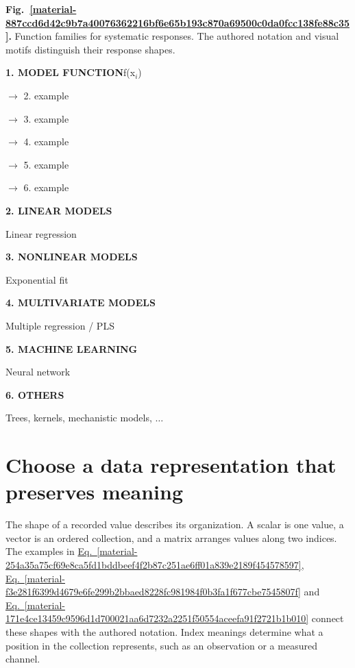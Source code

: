 \documentclass[11pt,a4paper]{article}
\begin{document}
\par\medskip
\Needspace{10cm}
\label{material-887ccd6d42c9b7a40076362216bf6e65b193c870a69500c0da0fcc138fe88c35}
\noindent\textbf{Fig.~\ref*{material-887ccd6d42c9b7a40076362216bf6e65b193c870a69500c0da0fcc138fe88c35}.} Function families for systematic responses. The authored notation and visual motifs distinguish their response shapes.\par\nopagebreak
\par\medskip\noindent\textcolor{pcd1}{\textbf{1. MODEL FUNCTION}}\quad f(x\ensuremath{{}_i})\par


\par\noindent $\longrightarrow$ 2. example
\par\noindent $\longrightarrow$ 3. example
\par\noindent $\longrightarrow$ 4. example
\par\noindent $\longrightarrow$ 5. example
\par\noindent $\longrightarrow$ 6. example
\par\medskip\noindent\textcolor{pcd2}{\textbf{2. LINEAR MODELS}}\par
Linear regression


\par\medskip\noindent\textcolor{pcd3}{\textbf{3. NONLINEAR MODELS}}\par
Exponential fit


\par\medskip\noindent\textcolor{pcd4}{\textbf{4. MULTIVARIATE MODELS}}\par
Multiple regression / PLS


\par\medskip\noindent\textcolor{pcd5}{\textbf{5. MACHINE LEARNING}}\par
Neural network


\par\medskip\noindent\textcolor{pcd1}{\textbf{6. OTHERS}}\par
Trees, kernels, mechanistic models, \ensuremath{\ldots}


\medskip

\clearpage
\section{Choose a data representation that preserves meaning}
The shape of a recorded value describes its organization. A scalar is one value, a vector is an ordered collection, and a matrix arranges values along two indices. The examples in \hyperref[material-254a35a75cf69e8ca5fd1bddbeef4f2b87c251ae6ff01a839e2189f454578597]{Eq.~\ref*{material-254a35a75cf69e8ca5fd1bddbeef4f2b87c251ae6ff01a839e2189f454578597}}, \hyperref[material-f3e281f6399d4679e6fe299b2bbaed8228fc981984f0b3fa1f677cbe7545807f]{Eq.~\ref*{material-f3e281f6399d4679e6fe299b2bbaed8228fc981984f0b3fa1f677cbe7545807f}} and \hyperref[material-171e4ce13459c9596d1d700021aa6d7232a2251f50554aceefa91f2721b1b010]{Eq.~\ref*{material-171e4ce13459c9596d1d700021aa6d7232a2251f50554aceefa91f2721b1b010}} connect these shapes with the authored notation. Index meanings determine what a position in the collection represents, such as an observation or a measured channel.
\end{document}
